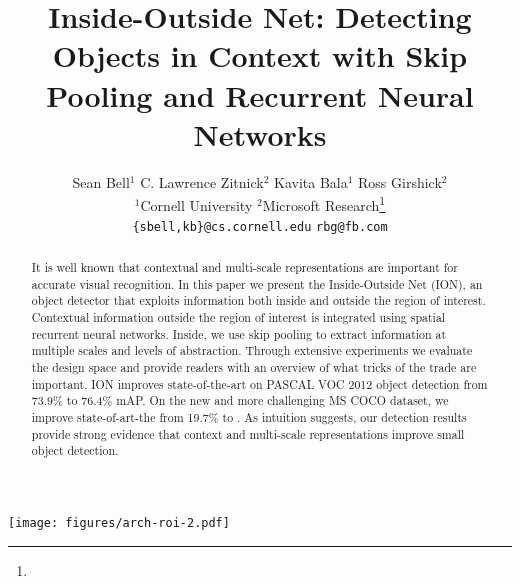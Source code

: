\documentclass[10pt,twocolumn,letterpaper]{article}
\begin{document}
\title{%
  \vspace{-0.43em}
  Inside-Outside Net:
  Detecting Objects in Context with Skip Pooling and
  Recurrent Neural Networks
  \vspace{-0.43em}
}

\author{%
Sean Bell$^1$
\qquad
C. Lawrence Zitnick$^2$
\qquad
Kavita Bala$^1$
\qquad
Ross Girshick$^2$
\\
$^1$Cornell University
\qquad
$^2$Microsoft Research\thanks{}\\
{\tt\small \{sbell,kb\}@cs.cornell.edu}
\qquad
{\tt\small rbg@fb.com}
}

\maketitle

\begin{abstract}
It is well known that contextual and multi-scale representations are important
for accurate visual recognition.  In this paper we present the Inside-Outside
Net (ION), an object detector that exploits information both inside and outside
the region of interest. Contextual information outside the region of interest is
integrated using spatial recurrent neural networks. Inside, we use skip pooling
to extract information at multiple scales and levels of abstraction.  Through
extensive experiments we evaluate the design space and provide readers with an
overview of what tricks of the trade are important.  ION improves
state-of-the-art on PASCAL VOC 2012 object detection from 73.9\% to 76.4\% mAP.
On the new and more challenging MS COCO dataset, we improve state-of-art-the
from 19.7\% to .  
As intuition suggests, our detection results provide
strong evidence that context and multi-scale representations improve small
object detection.
\vspace{-1em}
\end{abstract}
  \centering
  \texttt{[image: figures/arch-roi-2.pdf]}
  \caption{%
    \textbf{Inside-Outside Net (ION).}
    In a single pass, we extract VGG16~\cite{simonyan2015verydeep} features and
    evaluate 2000 proposed regions of interest (ROI).
    For each proposal, we extract a fixed-size
    descriptor from several layers using ROI pooling~\cite{fast-rcnn}.  Each
    descriptor is L2-normalized, concatenated, scaled, and
    dimension-reduced (1x1 convolution) to produce a fixed-length feature
    descriptor for each proposal of size 512x7x7.  Two fully-connected (fc)
    layers process each descriptor and produce two outputs: a one-of-$K$ class
    prediction (``softmax''), and an adjustment to the bounding box (``bbox'').
  }
  \label{fig:arch-roi}
\end{document}
